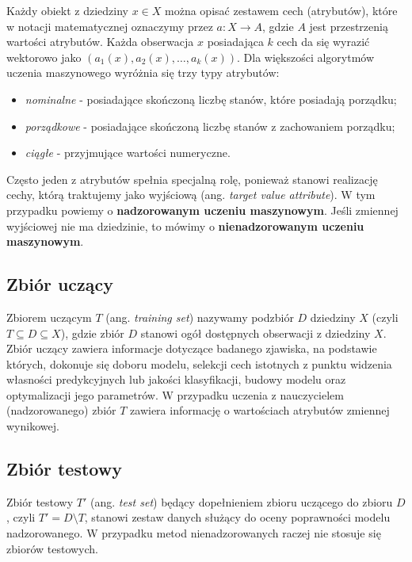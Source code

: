 \documentclass[
]{book}
\providecommand{\tightlist}{%
  \setlength{\itemsep}{0pt}\setlength{\parskip}{0pt}}
\theoremstyle{plain}
\theoremstyle{definition}
\theoremstyle{definition}
\theoremstyle{definition}
\theoremstyle{definition}
\theoremstyle{definition}
\theoremstyle{remark}
\begin{document}
Każdy obiekt z dziedziny \(x\in X\) można opisać zestawem cech (atrybutów), które w notacji matematycznej oznaczymy przez \(a:X\to A\), gdzie \(A\) jest przestrzenią wartości atrybutów. Każda obserwacja \(x\) posiadająca \(k\) cech da się wyrazić wektorowo jako \((a_1(x), a_2(x), \ldots, a_k(x))\). Dla większości algorytmów uczenia maszynowego wyróżnia się trzy typy atrybutów:

\begin{itemize}
\tightlist
\item
  \emph{nominalne} - posiadające skończoną liczbę stanów, które posiadają porządku;
\item
  \emph{porządkowe} - posiadające skończoną liczbę stanów z zachowaniem porządku;
\item
  \emph{ciągłe} - przyjmujące wartości numeryczne.
\end{itemize}

Często jeden z atrybutów spełnia specjalną rolę, ponieważ stanowi realizację cechy, którą traktujemy jako wyjściową (ang. \emph{target value attribute}). W tym przypadku powiemy o \textbf{nadzorowanym uczeniu maszynowym}. Jeśli zmiennej wyjściowej nie ma dziedzinie, to mówimy o \textbf{nienadzorowanym uczeniu maszynowym}.

\subsection{Zbiór uczący}\label{zbiuxf3r-uczux105cy}

Zbiorem uczącym \(T\) (ang. \emph{training set}) nazywamy podzbiór \(D\) dziedziny \(X\) (czyli \(T\subseteq D\subseteq X\)), gdzie zbiór \(D\) stanowi ogół dostępnych obserwacji z dziedziny \(X\). Zbiór uczący zawiera informacje dotyczące badanego zjawiska, na podstawie których, dokonuje się doboru modelu, selekcji cech istotnych z punktu widzenia własności predykcyjnych lub jakości klasyfikacji, budowy modelu oraz optymalizacji jego parametrów. W przypadku uczenia z nauczycielem (nadzorowanego) zbiór \(T\) zawiera informację o wartościach atrybutów zmiennej wynikowej.

\subsection{Zbiór testowy}\label{zbiuxf3r-testowy}

Zbiór testowy \(T'\) (ang. \emph{test set}) będący dopełnieniem zbioru uczącego do zbioru \(D\), czyli \(T'=D\setminus T\), stanowi zestaw danych służący do oceny poprawności modelu nadzorowanego. W przypadku metod nienadzorowanych raczej nie stosuje się zbiorów testowych.
\end{document}
